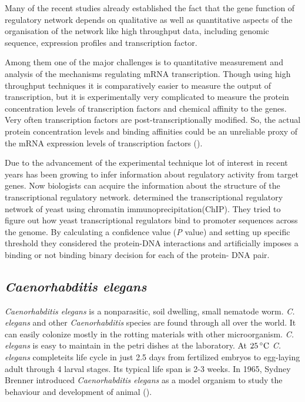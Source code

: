 Many of the recent studies already established 
the fact that the gene function of regulatory network depends on qualitative as well as 
quantitative aspects of the organisation of the network like high throughput data, including 
genomic sequence, expression profiles and transcription factor.

Among them one of the major challenges is to quantitative measurement and analysis of the 
mechanisms regulating mRNA transcription. Though using high throughput techniques it is 
comparatively easier to measure the output of transcription, but it is experimentally 
very complicated to measure the protein concentration levels of transcription factors and 
chemical affinity to the genes. Very often transcription factors are post-transcriptionally modified. 
So, the actual protein concentration levels and binding affinities could be an unreliable proxy 
of the mRNA expression levels of transcription factors (\cite{Sanguinetti:2006}).

Due to the advancement of the experimental technique lot of interest in recent years has been 
growing to infer information about regulatory activity from target genes. Now biologists can 
acquire the information about the structure of the transcriptional regulatory network.  
\cite{Lee:2002} determined the transcriptional regulatory network of yeast using 
chromatin immunoprecipitation(ChIP). They tried to figure out how yeast transcriptional regulators 
bind to promoter sequences across the genome. By calculating a confidence value (\textit{P} value)
and setting up specific threshold they considered the protein-DNA interactions and artificially
imposes a binding or not binding binary decision for each of the protein- DNA pair.

\subsection{\textit{Caenorhabditis elegans}}
\textit{Caenorhabditis elegans} is a nonparasitic, soil dwelling, small nematode worm. \textit{C. elegans} and 
other \textit{Caenorhabditis} species are found through all over the world. It can easily colonize 
mostly in the rotting materials with other microorganism. 
\textit{C. elegans} is easy to maintain in the petri dishes at the laboratory. At $25\,^{\circ}{\rm C}$
\textit{C. elegans} completeits life cycle in just 2.5 days from fertilized embryos to egg-laying 
adult through 4 larval stages. Its typical life span is 2-3 weeks. In 1965, Sydney Brenner 
introduced \textit{Caenorhabditis elegans} as a model organism to study the behaviour and development 
of animal (\cite{Brenner:1974}).

